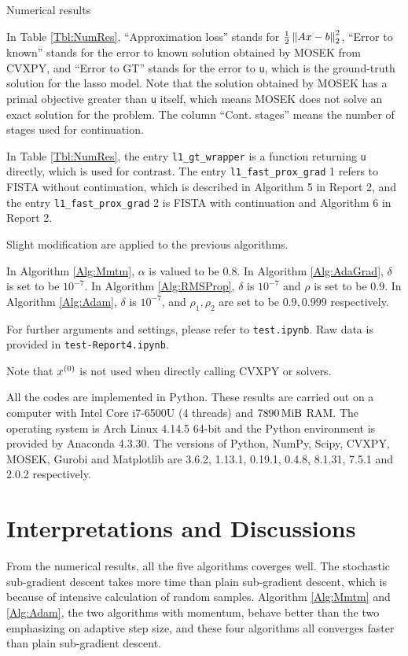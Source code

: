 \documentclass[english]{pkupaper}
\begin{document}
\begin{table}[htbp]
\caption{Numerical results} \label{Tbl:NumRes}
\end{table}

In Table \ref{Tbl:NumRes}, ``Approximation loss'' stands for $ \frac{1}{2} \left\|  A x - b  \right\|_2^2 $, ``Error to known'' stands for the error to known solution obtained by MOSEK from CVXPY, and ``Error to GT'' stands for the error to \verb"u", which is the ground-truth solution for the lasso model. Note that the solution obtained by MOSEK has a primal objective greater than \verb"u" itself, which means MOSEK does not solve an exact solution for the problem. The column ``Cont. stages'' means the number of stages used for continuation.

In Table \ref{Tbl:NumRes}, the entry \verb"l1_gt_wrapper" is a function returning \verb"u" directly, which is used for contrast. The entry \verb"l1_fast_prox_grad" 1 refers to FISTA without continuation, which is described in Algorithm 5 in Report 2, and the entry \verb"l1_fast_prox_grad" 2 is FISTA with continuation and Algorithm 6 in Report 2.

Slight modification are applied to the previous algorithms.

In Algorithm \ref{Alg:Mmtm}, $\alpha$ is valued to be $0.8$. In Algorithm \ref{Alg:AdaGrad}, $\delta$ is set to be $10^{-7}$. In Algorithm \ref{Alg:RMSProp}, $\delta$ is $10^{-7}$ and $\rho$ is set to be $0.9$. In Algorithm \ref{Alg:Adam}, $\delta$ is $10^{-7}$, and $ \rho_1, \rho_2 $ are set to be $ 0.9, 0.999 $ respectively.

For further arguments and settings, please refer to \verb"test.ipynb". Raw data is provided in \verb"test-Report4.ipynb".

Note that $x^{\left( 0 \right)}$ is not used when directly calling CVXPY or solvers.

All the codes are implemented in Python. These results are carried out on a computer with Intel Core i7-6500U (4 threads) and $\SI{7890}{\mebi\byte}$ RAM. The operating system is Arch Linux 4.14.5 64-bit and the Python environment is provided by Anaconda 4.3.30. The versions of Python, NumPy, Scipy, CVXPY, MOSEK, Gurobi and Matplotlib are 3.6.2, 1.13.1, 0.19.1, 0.4.8, 8.1.31, 7.5.1 and 2.0.2 respectively.

\section{Interpretations and Discussions}

From the numerical results, all the five algorithms coverges well. The stochastic sub-gradient descent takes more time than plain sub-gradient descent, which is because of intensive calculation of random samples. Algorithm \ref{Alg:Mmtm} and \ref{Alg:Adam}, the two algorithms with momentum, behave better than the two emphasizing on adaptive step size, and these four algorithms all converges faster than plain sub-gradient descent.
\end{document}

